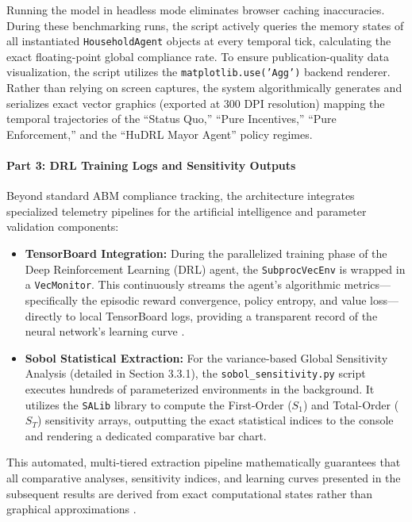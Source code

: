 Running the model in headless mode eliminates browser caching inaccuracies. During these benchmarking runs, the script actively queries the memory states of all instantiated \texttt{HouseholdAgent} objects at every temporal tick, calculating the exact floating-point global compliance rate. To ensure publication-quality data visualization, the script utilizes the \texttt{matplotlib.use('Agg')} backend renderer. Rather than relying on screen captures, the system algorithmically generates and serializes exact vector graphics (exported at 300 DPI resolution) mapping the temporal trajectories of the ``Status Quo,'' ``Pure Incentives,'' ``Pure Enforcement,'' and the ``HuDRL Mayor Agent'' policy regimes.

\paragraph{Part 3: DRL Training Logs and Sensitivity Outputs}
Beyond standard ABM compliance tracking, the architecture integrates specialized telemetry pipelines for the artificial intelligence and parameter validation components:
\begin{itemize}
    \item \textbf{TensorBoard Integration:} During the parallelized training phase of the Deep Reinforcement Learning (DRL) agent, the \texttt{SubprocVecEnv} is wrapped in a \texttt{VecMonitor}. This continuously streams the agent's algorithmic metrics—specifically the episodic reward convergence, policy entropy, and value loss—directly to local TensorBoard logs, providing a transparent record of the neural network's learning curve \citep{Raffin2021}.
    \item \textbf{Sobol Statistical Extraction:} For the variance-based Global Sensitivity Analysis (detailed in Section 3.3.1), the \texttt{sobol\_sensitivity.py} script executes hundreds of parameterized environments in the background. It utilizes the \texttt{SALib} library to compute the First-Order ($S_1$) and Total-Order ($S_T$) sensitivity arrays, outputting the exact statistical indices to the console and rendering a dedicated comparative bar chart.
\end{itemize}

This automated, multi-tiered extraction pipeline mathematically guarantees that all comparative analyses, sensitivity indices, and learning curves presented in the subsequent results are derived from exact computational states rather than graphical approximations \citep{McCulloch2022}.